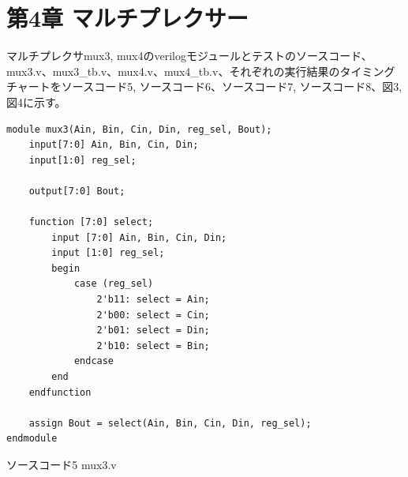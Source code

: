 \documentclass[12pt]{jreport}
\begin{document}
    \chapter*{第4章 マルチプレクサー}
        マルチプレクサmux3, mux4のverilogモジュールとテストのソースコード、mux3.v、mux3\_tb.v、mux4.v、mux4\_tb.v、それぞれの実行結果のタイミングチャートをソースコード5, ソースコード6、ソースコード7, ソースコード8、図3, 図4に示す。
        \begin{center}
            \begin{lstlisting}[basicstyle=\ttfamily\footnotesize, frame=single]
module mux3(Ain, Bin, Cin, Din, reg_sel, Bout);
    input[7:0] Ain, Bin, Cin, Din;
    input[1:0] reg_sel;

    output[7:0] Bout;
    
    function [7:0] select;
        input [7:0] Ain, Bin, Cin, Din;
        input [1:0] reg_sel;
        begin
            case (reg_sel)
                2'b11: select = Ain;
                2'b00: select = Cin;
                2'b01: select = Din;
                2'b10: select = Bin;
            endcase
        end
    endfunction

    assign Bout = select(Ain, Bin, Cin, Din, reg_sel);
endmodule
            \end{lstlisting}
            ソースコード5 mux3.v
        \end{center}
\end{document}
